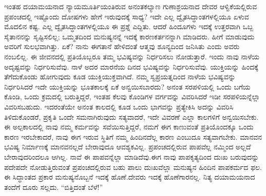 ಇಂತಹ ದಯಾಮಯನಾದ ನ್ಯಾಯಮೂರ್ತಿಯಂತಿರುವ ಅನಂತಕಲ್ಯಾಣ ಗುಣಾಶ್ರಯನಾದ ದೇವರ ಆಳ್ವಿಕೆಯಲ್ಲಿರುವ ಪ್ರಪಂಚದಲ್ಲಿ ಇಷ್ಟೊಂದು ದೋಷಗಳು ಹೇಗೆ ಇರುವುದಕ್ಕೆ ಸಾಧ್ಯ? ಇದೇ ಎಲ್ಲ ದ್ವೈತಸಿದ್ಧಾಂತಗಳಲ್ಲಿಯೂ ಏಳುವ ಮೊದಲಿನ ಕಷ್ಟ. ಎಲ್ಲ ದ್ವೈತಸಿದ್ಧಾಂತಗಳಲ್ಲಿಯೂ ಈ ಪ್ರಶ್ನೆ ಎದ್ದಿತು. ಆದರೆ ಹಿಂದೂಗಳು ಇದಕ್ಕೆ ಉತ್ತರವಾಗಿ ಒಬ್ಬ ಸೈತಾನನನ್ನು ಸೃಷ್ಟಿಸಲಿಲ್ಲ; ಒಮ್ಮತದಿಂದ ಮನುಷ್ಯನನ್ನೆ ಇದಕ್ಕೆ ಕಾರಣಕರ್ತನನ್ನಾಗಿ ಮಾಡಿದರು. ಹೀಗೆ ಮಾಡುವುದು ಅವರಿಗೆ ಸುಲಭವಾಗಿತ್ತು. ಏಕೆ? ನಾನು ಈಗತಾನೆ ಹೇಳಿದಂತೆ ಆತ್ಮವು ಶೂನ್ಯದಿಂದ ಜನಿಸಿತು ಎಂದು ಅವರು ನಂಬಲಿಲ್ಲ. ಈ ಜೀವನದಲ್ಲಿ ಪ್ರತಿಯೊಬ್ಬರೂ ತಮ್ಮ ಭವಿಷ್ಯವನ್ನು ನಿರ್ಧರಿಸಲು ನೋಡುತ್ತಾರೆ. ಇಂದು ನಾವು ನಾಳೆಯ ಅದೃಷ್ಟವನ್ನು ನಿರ್ಧರಿಸುವೆವು. ನಾಳೆ ಅದರ ಮಾರನೆಯ ದಿನದ ಭವಿಷ್ಯವನ್ನು ನಿರ್ಧರಿಸುವೆವು. ಯುಕ್ತಿಯನ್ನು ಹಿಂದಕ್ಕೆ ತೆಗೆದುಕೊಂಡು ಹೋಗುವುದು ಕೂಡ ಯುಕ್ತಿಯುಕ್ತವಾಗಿದೆ. ನಮ್ಮ ಸ್ವಪ್ರಯತ್ನದಿಂದ ನಾಳೆಯ ಭವಿಷ್ಯವನ್ನು ನಿರ್ಧರಿಸಿದರೆ ಇದೇ ಯುಕ್ತಿಯನ್ನು ಭೂತಕಾಲಕ್ಕೆ ಏಕೆ ಅನ್ವಯಿಸಬಾರದು? ಅನಂತ ಸರಪಳಿಯಲ್ಲಿ ಒಂದು ಬಗೆಯ ಕೊಂಡಿ, ಒಂದು ಕ್ರಮದಲ್ಲಿ ಬರುತ್ತಿದ್ದರೆ, ಇಂತಹ ಕೆಲವು ಕೊಂಡಿಗಳ ವರ್ಗವನ್ನು ವಿವರಿಸಿದರೆ ಇಡೀ ಸರಪಳಿಯನ್ನೆಲ್ಲಾ ವಿವರಿಸಬಹುದು. ಇದರಂತೆಯೇ ಅನಂತ ಕಾಲದಲ್ಲಿ ಕೂಡ ಒಂದು ಭಾಗವನ್ನು ಪ್ರತ್ಯೇಕಿಸಿ ಅದನ್ನು ವಿವರಿಸಿ ತಿಳಿದುಕೊಂಡರೆ, ಪ್ರಕೃತಿ ಒಂದೇ ಸಮನಾಗಿರುವುದು ಸತ್ಯವಾದರೆ, ಇದೇ ವಿವರಣೆ ಎಲ್ಲಾ ಕಾಲಗಳಿಗೆ ಅನ್ವಯಿಸಬೇಕು. ಈ ಅಲ್ಪಕಾಲದಲ್ಲಿ ನಾವು ನಮ್ಮ ಕರ್ಮವನ್ನು ಸವೆಯಿಸುತ್ತಿದ್ದರೆ, ನಮಗೆ ಈಗ ಕಾಣುವಂತೆ ಪ್ರತಿಯೊಂದಕ್ಕೂ ಒಂದು ಕಾರಣ ಇರಬೇಕಾದರೆ, ನಾವು ಈಗ ಇರುವ ಸ್ಥಿತಿಗೆ ನಮ್ಮ ಹಿಂದಿನದೆಲ್ಲ ಕಾರಣ ಎಂಬುದೂ ಸತ್ಯವಾಗಬೇಕು. ಮಾನವನ ಭವಿಷ್ಯ ನಿರ್ಮಾಣಕ್ಕೆ ಮಾನವನಲ್ಲದೆ ಬೇರಾವುದೂ ಆವಶ್ಯಕವಿಲ್ಲ. ಪ್ರಪಂಚದಲ್ಲಿರುವ ಪಾಪವೆಲ್ಲ ನಮ್ಮಿಂದ ಅಲ್ಲದೆ ಬೇರಾವುದರಿಂದಲೂ ಆಗಿಲ್ಲ. ನಾವೆ ಈ ಪಾಪವನ್ನೆಲ್ಲಾ ಮಾಡಿದೆವು.ಈಗ ನಾವು ಪಾಪಕೃತ್ಯದಿಂದ ದುಃಖ ಬರುವುದನ್ನು ಪದೇಪದೇ ನೋಡುತ್ತಿರುವಂತೆ ಪ್ರಪಂಚದಲ್ಲಿರುವ ಬಹು ಪಾಲು ದುಃಖವೆಲ್ಲಾ ಮನುಷ್ಯನ ಹಿಂದಿನ ಪಾಪಕರ್ಮದ ಫಲ. ಈ ಸಿದ್ಧಾಂತದ ಪ್ರಕಾರ ಮನುಷ್ಯನೊಬ್ಬನೆ ಇದಕ್ಕೆ ಹೊಣೆ.ದೇವರು ಇದಕ್ಕೆ ಹೊಣೆಗಾರನಲ್ಲ. ನಿತ್ಯ ದಯಾಮಯನಾದ ತಂದೆಗೆ ದೂರು ಸಲ್ಲದು. “ಬಿತ್ತಿದಂತೆ ಬೆಳೆ!”

